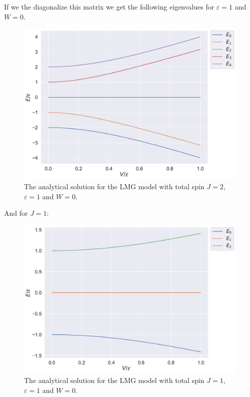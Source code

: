 If we the diagonalize this matrix we get the following eigenvalues for $\varepsilon = 1$ and $W = 0$.

\begin{figure}[H]
    \centering
    \includegraphics[width=\textwidth]{Figures/Plots/Lipkin/J2_true.pdf}
    \caption{The analytical solution for the LMG model with total spin $J=2$, $\varepsilon = 1$ and $W = 0$.}
    \label{fig:J2_true}
\end{figure}

And for $J=1$:

\begin{figure}[H]
    \centering
    \includegraphics[width=\textwidth]{Figures/Plots/Lipkin/J1_true.pdf}
    \caption{The analytical solution for the LMG model with total spin $J=1$, $\varepsilon = 1$ and $W = 0$.}
    \label{fig:J1_true}
\end{figure}




